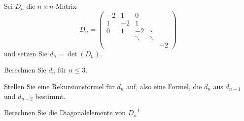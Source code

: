 Sei $D_n$ die $n\times n$-Matrix
\[
D_n=\begin{pmatrix}
-2& 1&     0&      &  \\
 1&-2&     1&      &  \\
 0& 1&    -2&\ddots&  \\
  &  &\ddots&\ddots&  \\
  &  &      &      &-2
\end{pmatrix}
\]
und setzen Sie $d_n=\det(D_n)$.
\begin{teilaufgaben}
\item Berechnen Sie $d_n$ für $n\le 3$.
\item Stellen Sie eine Rekursionsformel für $d_n$ auf, also eine Formel,
die $d_{n}$ aus  $d_{n-1}$ und $d_{n-2}$ bestimmt.
\item Berechnen Sie die Diagonalelemente von $D_n^{-1}$
\end{teilaufgaben}

